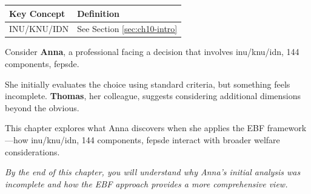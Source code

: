 \begin{tcolorbox}[
    colback=gray!5!white,
    colframe=gray!75!black,
    title={\textbf{Begriffe in diesem Kapitel}},
    fonttitle=\bfseries
]
\small
\begin{tabular}{@{}ll@{}}
\textbf{Key Concept} & \textbf{Definition} \\
\midrule
INU/KNU/IDN & See Section \ref{sec:ch10-intro} \\
\end{tabular}
\end{tcolorbox}



\begin{tcolorbox}[
    colback=blue!5!white,
    colframe=blue!75!black,
    title={\textbf{Intuition: A Motivating Example}},
    fonttitle=\bfseries
]
Consider \textbf{Anna}, a professional facing a decision that involves inu/knu/idn, 144 components, fepsde.

She initially evaluates the choice using standard criteria, but something feels incomplete.
\textbf{Thomas}, her colleague, suggests considering additional dimensions beyond the obvious.

This chapter explores what Anna discovers when she applies the EBF framework---how
inu/knu/idn, 144 components, fepsde interact with broader welfare considerations.

\medskip
\textit{By the end of this chapter, you will understand why Anna's initial analysis
was incomplete and how the EBF approach provides a more comprehensive view.}
\end{tcolorbox}




